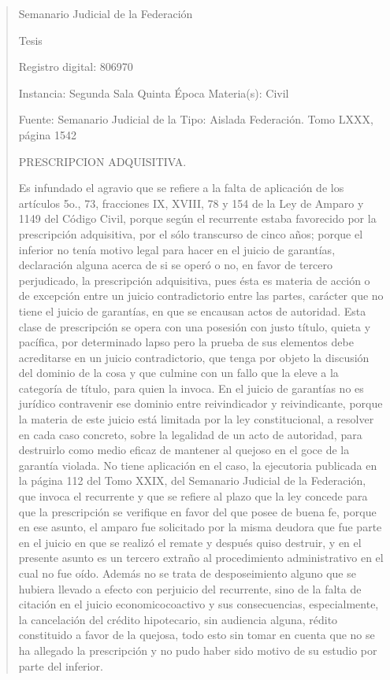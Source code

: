 \documentclass[11pt,a4paper]{article}
\begin{document}
\begin{quote}
                                                   Semanario Judicial de la Federación

                                                  Tesis

 Registro digital: 806970

 Instancia: Segunda Sala           Quinta Época                           Materia(s): Civil

                                   Fuente: Semanario Judicial de la       Tipo: Aislada
                                   Federación.
                                   Tomo LXXX, página 1542


PRESCRIPCION ADQUISITIVA.


Es infundado el agravio que se refiere a la falta de aplicación de los artículos 5o., 73, fracciones IX,
XVIII, 78 y 154 de la Ley de Amparo y 1149 del Código Civil, porque según el recurrente estaba
favorecido por la prescripción adquisitiva, por el sólo transcurso de cinco años; porque el inferior no
tenía motivo legal para hacer en el juicio de garantías, declaración alguna acerca de si se operó o
no, en favor de tercero perjudicado, la prescripción adquisitiva, pues ésta es materia de acción o de
excepción entre un juicio contradictorio entre las partes, carácter que no tiene el juicio de garantías,
en que se encausan actos de autoridad. Esta clase de prescripción se opera con una posesión con
justo título, quieta y pacífica, por determinado lapso pero la prueba de sus elementos debe
acreditarse en un juicio contradictorio, que tenga por objeto la discusión del dominio de la cosa y
que culmine con un fallo que la eleve a la categoría de título, para quien la invoca. En el juicio de
garantías no es jurídico contravenir ese dominio entre reivindicador y reivindicante, porque la
materia de este juicio está limitada por la ley constitucional, a resolver en cada caso concreto, sobre
la legalidad de un acto de autoridad, para destruirlo como medio eficaz de mantener al quejoso en el
goce de la garantía violada. No tiene aplicación en el caso, la ejecutoria publicada en la página 112
del Tomo XXIX, del Semanario Judicial de la Federación, que invoca el recurrente y que se refiere al
plazo que la ley concede para que la prescripción se verifique en favor del que posee de buena fe,
porque en ese asunto, el amparo fue solicitado por la misma deudora que fue parte en el juicio en
que se realizó el remate y después quiso destruir, y en el presente asunto es un tercero extraño al
procedimiento administrativo en el cual no fue oído. Además no se trata de desposeimiento alguno
que se hubiera llevado a efecto con perjuicio del recurrente, sino de la falta de citación en el juicio
economicocoactivo y sus consecuencias, especialmente, la cancelación del crédito hipotecario, sin
audiencia alguna, rédito constituido a favor de la quejosa, todo esto sin tomar en cuenta que no se
ha allegado la prescripción y no pudo haber sido motivo de su estudio por parte del inferior.



\end{quote}
\end{document}
